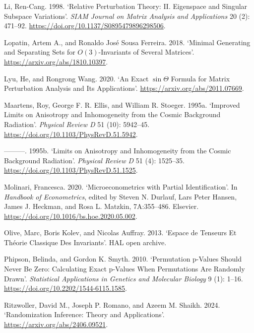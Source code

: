 \documentclass[
  11pt,
  a4paper]{article}
\newlength{\cslhangindent}
\newlength{\cslentryspacingunit} %
\newenvironment{CSLReferences}[2] %
 {%
  \setlength{\parindent}{0pt}
  \ifodd #1
  \let\oldpar\par
  \def\par{\hangindent=\cslhangindent\oldpar}
  \fi
  \setlength{\parskip}{#2\cslentryspacingunit}
 }%
 {}
\begin{document}
\begin{CSLReferences}{1}{0}
\leavevmode{}%
Li, Ren-Cang. 1998. {`Relative Perturbation Theory: {II}. Eigenspace and Singular Subspace Variations'}. \emph{SIAM Journal on Matrix Analysis and Applications} 20 (2): 471--92. \url{https://doi.org/10.1137/S0895479896298506}.

\leavevmode{}%
Lopatin, Artem A., and Ronaldo José Sousa Ferreira. 2018. {`Minimal Generating and Separating Sets for \(O(3)\)-Invariants of Several Matrices'}. \url{https://arxiv.org/abs/1810.10397}.

\leavevmode{}%
Lyu, He, and Rongrong Wang. 2020. {`An Exact \(\sin\Theta\) Formula for Matrix Perturbation Analysis and Its Applications'}. \url{https://arxiv.org/abs/2011.07669}.

\leavevmode{}%
Maartens, Roy, George F. R. Ellis, and William R. Stoeger. 1995a. {`Improved Limits on Anisotropy and Inhomogeneity from the Cosmic Background Radiation'}. \emph{Physical Review D} 51 (10): 5942--45. \url{https://doi.org/10.1103/PhysRevD.51.5942}.

\leavevmode{}%
---------. 1995b. {`Limits on Anisotropy and Inhomogeneity from the Cosmic Background Radiation'}. \emph{Physical Review D} 51 (4): 1525--35. \url{https://doi.org/10.1103/PhysRevD.51.1525}.

\leavevmode{}%
Molinari, Francesca. 2020. {`Microeconometrics with Partial Identification'}. In \emph{Handbook of Econometrics}, edited by Steven N. Durlauf, Lars Peter Hansen, James J. Heckman, and Rosa L. Matzkin, 7A:355--486. Elsevier. \url{https://doi.org/10.1016/bs.hoe.2020.05.002}.

\leavevmode{}%
Olive, Marc, Boris Kolev, and Nicolas Auffray. 2013. {`Espace de Tenseurs Et Théorie Classique Des Invariants'}. HAL open archive.

\leavevmode{}%
Phipson, Belinda, and Gordon K. Smyth. 2010. {`Permutation p-Values Should Never Be Zero: Calculating Exact p-Values When Permutations Are Randomly Drawn'}. \emph{Statistical Applications in Genetics and Molecular Biology} 9 (1): 1--16. \url{https://doi.org/10.2202/1544-6115.1585}.

\leavevmode{}%
Ritzwoller, David M., Joseph P. Romano, and Azeem M. Shaikh. 2024. {`Randomization Inference: Theory and Applications'}. \url{https://arxiv.org/abs/2406.09521}.


\end{CSLReferences}
\end{document}

